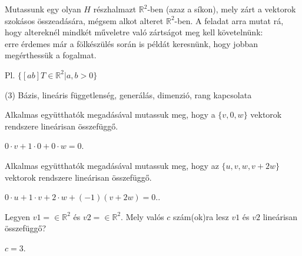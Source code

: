 \begin{frame}
  \begin{tcolorbox}[title={2/5. -Q-}]
      Mutassunk egy olyan $H$ részhalmazt $\mathbb{R}^2$-ben (azaz a síkon), mely zárt a vektorok szokásos összeadására, mégsem alkot alteret $\mathbb{R}^2$-ben.
  \tcblower
    A feladat arra mutat rá, hogy altereknél mindkét műveletre való zártságot meg kell követelnünk:\\
    
    erre érdemes már a fölkészülés során is példát keresnünk, hogy jobban megérthessük a fogalmat.
    \mmedskip 
    
    Pl. $\{[a b]T \in \mathbb{R}^2|a,b > 0\}$
  \end{tcolorbox}
\end{frame}


\begin{frame}[plain]
\begin{tcolorbox}[center, colback={myyellow}, coltext={black}, colframe={myyellow}]
    {\RHuge  (3) Bázis, lineáris függetlenség, generálás, dimenzió, rang kapcsolata}
    \mmedskip
\end{tcolorbox}
\end{frame}

\begin{frame}
  \begin{tcolorbox}[title={3/1. -N-}]
      Alkalmas együtthatók megadásával mutassuk meg, hogy a $\{v,0,w\}$ vektorok rendszere lineárisan összefüggő.
  \tcblower

    \mmedskip 
  
    $0 \cdot v + 1 \cdot 0 + 0 \cdot w = 0$.
  \end{tcolorbox}
\end{frame}


\begin{frame}
  \begin{tcolorbox}[title={3/2. -N-}]
       Alkalmas együtthatók megadásával mutassuk meg, hogy az $\{u,v,w,v+2w\}$ vektorok rendszere lineárisan összefüggő.
  \tcblower

    \mmedskip 
  
    $0 \cdot u + 1 \cdot v + 2 \cdot w + (-1)(v + 2w) = 0.$.
  \end{tcolorbox}
\end{frame}


\begin{frame}
  \begin{tcolorbox}[title={3/3. -N-}]
       Legyen $v1 =  \in \mathbb{R}^2$ és $v2 =  \in \mathbb{R}^2$. Mely valós $c$ szám(ok)ra lesz $v1$ és $v2$ lineárisan összefüggő?
  \tcblower

    \mmedskip 
  
    $c = 3$.
  \end{tcolorbox}
\end{frame}



